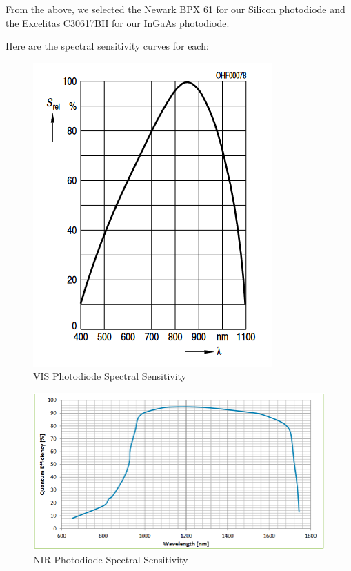 From the above, we selected the Newark BPX 61 for our Silicon photodiode and the Excelitas C30617BH for our InGaAs photodiode.

Here are the spectral sensitivity curves for each:

\begin{figure}[H]
    \caption{VIS Photodiode Spectral Sensitivity}
    \centering
    \includegraphics[width=\textwidth]{images/NewarkBPX61.png}
\end{figure}

\begin{figure}[H]
    \caption{NIR Photodiode Spectral Sensitivity}
    \centering
    \includegraphics[width=\textwidth]{images/DigikeyExcilitasNIRSensor.png}
\end{figure}